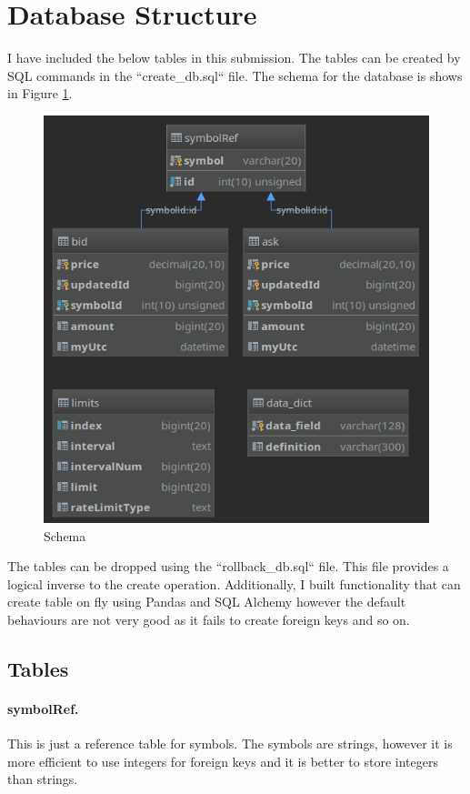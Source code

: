 \documentclass[12pt]{article}
\begin{document}
\pagebreak

\section*{Database Structure}
I have included the below tables in this submission. The tables can be created by SQL commands in the ``create\_db.sql`` file. The schema for the database is shows in Figure \ref{fig:schema}.\\
\begin{figure}[h!]
  \centering
  \includegraphics[scale=0.40]{schema.png}
  \caption{Schema}
  \label{fig:schema}
\end{figure}

The tables can be dropped using the ``rollback\_db.sql`` file. This file provides a logical inverse to the create operation. Additionally, I built functionality that can create table on fly using Pandas and SQL Alchemy however the default behaviours are not very good as it fails to create foreign keys and so on.

\subsection*{Tables}
\paragraph*{symbolRef.} This is just a reference table for symbols. The symbols are strings, however it is more efficient to use integers for foreign keys and it is better to store integers than strings.
\end{document}
